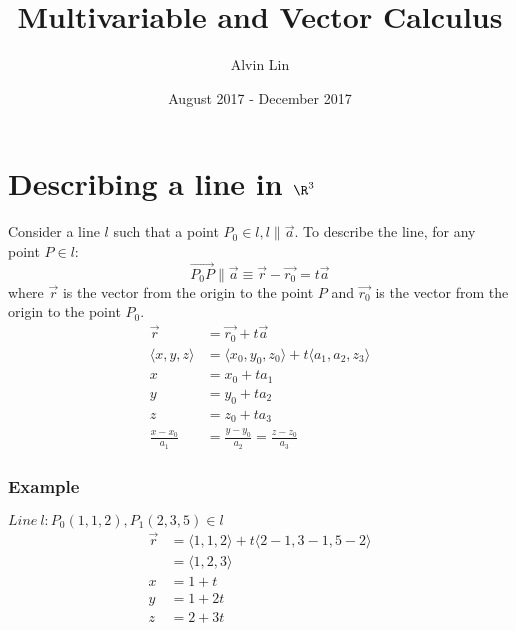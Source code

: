 \documentclass[letterpaper, 12pt]{math}
\title{Multivariable and Vector Calculus}
\author{Alvin Lin}
\date{August 2017 - December 2017}
\begin{document}
\maketitle

\section*{Describing a line in \( \R^3 \)}
Consider a line \( l \) such that a point \( P_0\in l, l\parallel\vec{a} \).
To describe the line, for any point \( P\in l \):
\[ \overrightarrow{P_{0}P}\parallel\vec{a} \equiv \vec{r}-\vec{r_0}=t\vec{a} \]
where \( \vec{r} \) is the vector from the origin to the point \( P \) and
\( \vec{r_0} \) is the vector from the origin to the point \( P_0 \).
\begin{align*}
  \vec{r} &= \vec{r_0}+t\vec{a} \\
  \langle x,y,z\rangle &= \langle x_0,y_0,z_0\rangle+
    t\langle a_1,a_2,z_3\rangle \\
  x &= x_0+ta_1 \\
  y &= y_0+ta_2 \\
  z &= z_0+ta_3 \\
  \frac{x-x_0}{a_1} &= \frac{y-y_0}{a_2} = \frac{z-z_0}{a_3}
\end{align*}

\subsubsection*{Example}
\( Line\ l: P_0(1,1,2), P_1(2,3,5)\in l \)
\begin{align*}
  \vec{r} &= \langle1,1,2\rangle+t\langle2-1,3-1,5-2\rangle \\
  &= \langle1,2,3\rangle \\
  x &= 1+t \\
  y &= 1+2t \\
  z &= 2+3t
\end{align*}
\end{document}
